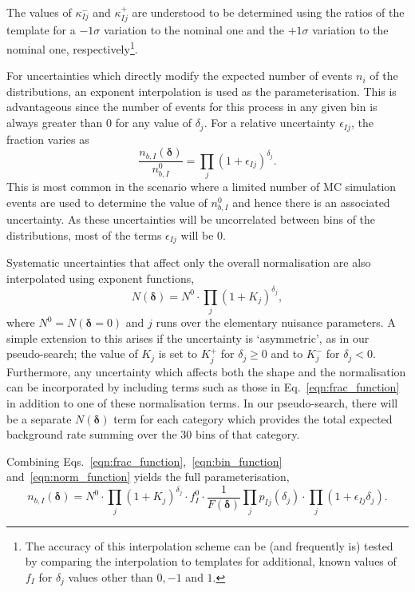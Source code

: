\documentclass[11pt]{article}
\begin{document}
\clearpage

The values of $\kappa_{Ij}^{-}$ and $\kappa_{Ij}^{+}$ are understood to be determined using the ratios of the template for a $-1\sigma$ variation to the nominal one and the $+1\sigma$
variation to the nominal one, respectively\footnote{The accuracy of this interpolation scheme can be (and frequently is) tested by comparing the interpolation to templates for additional, known values of $f_{I}$ for $\delta_{j}$ values other than $0,-1$ and $1$.}.




For uncertainties which directly modify the expected number of events $n_{i}$ of the distributions, an exponent interpolation is used as the parameterisation.
This is advantageous since the number of events for this process in any given bin is always greater than 0 for any value of $\delta_{j}$. For a relative uncertainty $\epsilon_{Ij}$, the fraction varies as
%
\begin{equation}
 \frac{n_{b,I}(\bm{\delta})}{n_{b,I}^{0}}  =  \prod_{j} (1+\epsilon_{Ij})^{\delta_{j}}.
  \label{eqn:bin_function}
\end{equation}
%
This is most common in the scenario where a limited number of MC simulation events are used to determine the value of $n_{b,I}^{0}$
and hence there is an associated uncertainty. As these uncertainties will be uncorrelated between bins of the distributions, most of the terms $\epsilon_{Ij}$ will be 0.

Systematic uncertainties that affect only the overall normalisation are also interpolated using exponent functions,
%
\begin{equation}
 N(\bm{\delta})  =   N^{0} \cdot \prod_{j} (1+K_{j})^{\delta_{j}},
 \label{eqn:norm_function}
\end{equation}
%
where $N^{0} = N(\bm{\delta}=0)$ and $j$ runs over the elementary nuisance parameters.  A simple extension to this arises if the uncertainty is `asymmetric', as in our pseudo-search;
the value of $K_{j}$ is set to $K^{+}_{j}$ for $\delta_{j}\geq0$ and to $K^{-}_{j}$ for $\delta_{j} < 0$. Furthermore, any uncertainty which affects both the
shape and the normalisation can be incorporated by including terms such as those in Eq.~\eqref{eqn:frac_function} in addition to one of these normalisation terms.
In our pseudo-search, there will be a separate $N(\bm{\delta})$ term for each category which provides the total expected background rate summing over the 30 bins of that category.

Combining Eqs.~\eqref{eqn:frac_function},~\eqref{eqn:bin_function} and~\eqref{eqn:norm_function} yields the full parameterisation,
%
\begin{equation}
 n_{b,I}(\bm{\delta}) = N^{0}\cdot \prod_{j}(1+K_{j})^{\delta_{j}} \cdot f^{0}_{I} \cdot\frac{1}{F(\bm{\delta})} \prod_{j} p_{Ij}(\delta_{j}) \cdot \prod_{j} (1+\epsilon_{Ij}\delta_{j}).
\label{eqn:expt_param}
\end{equation}
\end{document}
